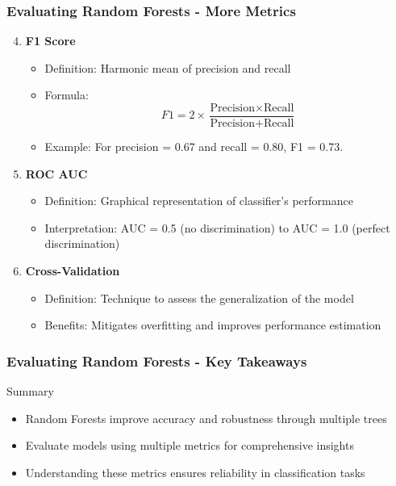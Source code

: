 \documentclass[aspectratio=169]{beamer}
\begin{document}
\begin{frame}[fragile]
    \frametitle{Evaluating Random Forests - More Metrics}
    \begin{enumerate}
        \setcounter{enumi}{3} %
        \item \textbf{F1 Score}
            \begin{itemize}
                \item Definition: Harmonic mean of precision and recall
                \item Formula: 
                \begin{equation}
                F1 = 2 \times \frac{\text{Precision} \times \text{Recall}}{\text{Precision} + \text{Recall}}
                \end{equation}
                \item Example: For precision = 0.67 and recall = 0.80, F1 = 0.73.
            \end{itemize}

        \item \textbf{ROC AUC}
            \begin{itemize}
                \item Definition: Graphical representation of classifier’s performance
                \item Interpretation: AUC = 0.5 (no discrimination) to AUC = 1.0 (perfect discrimination)
            \end{itemize}

        \item \textbf{Cross-Validation}
            \begin{itemize}
                \item Definition: Technique to assess the generalization of the model
                \item Benefits: Mitigates overfitting and improves performance estimation
            \end{itemize}
    \end{enumerate}
\end{frame}

\begin{frame}[fragile]
    \frametitle{Evaluating Random Forests - Key Takeaways}
    \begin{block}{Summary}
        \begin{itemize}
            \item Random Forests improve accuracy and robustness through multiple trees
            \item Evaluate models using multiple metrics for comprehensive insights
            \item Understanding these metrics ensures reliability in classification tasks
        \end{itemize}
    \end{block}
\end{frame}
\end{document}

